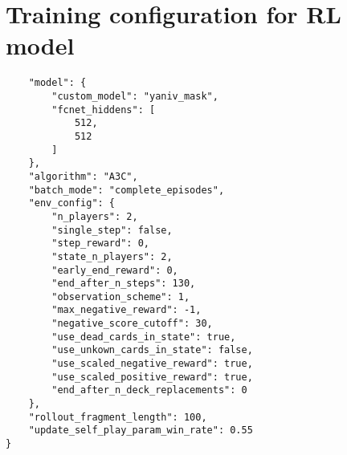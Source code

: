 \documentclass[../main.tex]{subfiles}
\begin{document}
\appendix
\chapter{Training configuration for RL model} \label{apx:training-config}
\begin{verbatim}
    "model": {
        "custom_model": "yaniv_mask",
        "fcnet_hiddens": [
            512,
            512
        ]
    },
    "algorithm": "A3C",
    "batch_mode": "complete_episodes",
    "env_config": {
        "n_players": 2,
        "single_step": false,
        "step_reward": 0,
        "state_n_players": 2,
        "early_end_reward": 0,
        "end_after_n_steps": 130,
        "observation_scheme": 1,
        "max_negative_reward": -1,
        "negative_score_cutoff": 30,
        "use_dead_cards_in_state": true,
        "use_unkown_cards_in_state": false,
        "use_scaled_negative_reward": true,
        "use_scaled_positive_reward": true,
        "end_after_n_deck_replacements": 0
    },
    "rollout_fragment_length": 100,
    "update_self_play_param_win_rate": 0.55
}
\end{verbatim}
\end{document}
